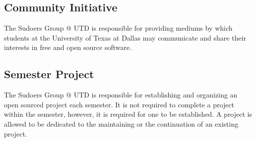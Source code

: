 \documentclass{constitution}
\begin{document}
\subsection{Community Initiative}
The Sudoers Group @ UTD is responsible for providing mediums by which students at the University of Texas at Dallas may communicate and share their interests in free and open source software.

\subsection{Semester Project}
The Sudoers Group @ UTD is responsible for establishing and organizing an open sourced project each semester.
It is not required to complete a project within the semester, however, it is required for one to be established.
A project is allowed to be dedicated to the maintaining or the continuation of an existing project.
\end{document}
